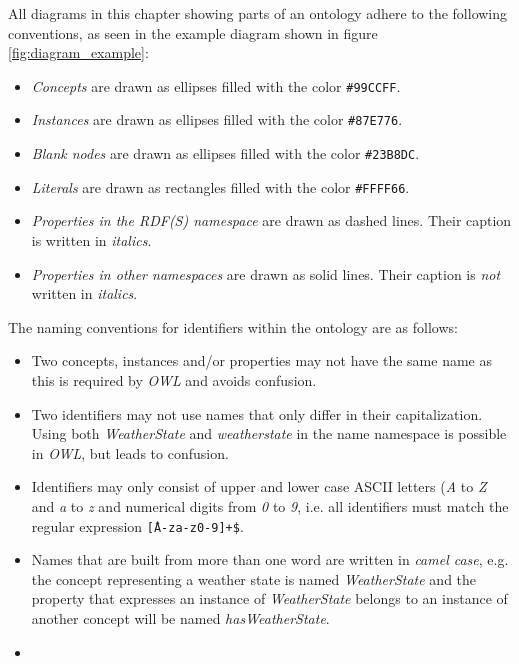 
All diagrams in this chapter showing parts of an ontology adhere to the following conventions, as seen in the example diagram shown in figure \ref{fig:diagram_example}:
\begin{itemize}
  \item \emph{Concepts} are drawn as ellipses filled with the color \texttt{\textcolor{convention_color1}{\#99CCFF}}.
  \item \emph{Instances} are drawn as ellipses filled with the color \texttt{\textcolor{convention_color2}{\#87E776}}.
  \item \emph{Blank nodes} are drawn as ellipses filled with the color \texttt{\textcolor{convention_color3}{\#23B8DC}}.
  \item \emph{Literals} are drawn as rectangles filled with the color \texttt{\colorbox{convention_color_bg4}{\textcolor{convention_color4}{\#FFFF66}}}.
  \item \emph{Properties in the RDF(S) namespace} are drawn as dashed lines. Their caption is written in \emph{italics}.
  \item \emph{Properties in other namespaces} are drawn as solid lines. Their caption is \emph{not} written in \emph{italics}.
\end{itemize}

The naming conventions for identifiers within the ontology are as follows:
\begin{itemize}
  \item Two concepts, instances and/or properties may not have the same name as this is required by \emph{OWL} and avoids confusion.
  \item Two identifiers may not use names that only differ in their capitalization. Using both \emph{WeatherState} and \emph{weatherstate} in the name namespace is possible in \emph{OWL}, but leads to confusion.
  \item Identifiers may only consist of upper and lower case ASCII letters (\emph{A} to \emph{Z} and \emph{a} to \emph{z} and numerical digits from \emph{0} to \emph{9}, i.e. all identifiers must match the regular expression \texttt{\^[A-za-z0-9]+\$}.
  \item Names that are built from more than one word are written in \emph{camel case}\cite{CamelCase}, e.g. the concept representing a weather state is named \emph{WeatherState} and the property that expresses an instance of \emph{WeatherState} belongs to an instance of another concept will be named \emph{hasWeatherState}.
  \item 
\end{itemize}


